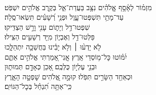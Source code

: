 \documentclass[twoside, openany, parskip=half, 11pt]{book}
\begin{document}
\\
\vspace{-1.5\baselineskip}
\begin{narrow}
%
מִזְמ֗וֹר לְאָ֫סָ֥ף \hfill \break
אֱֽלֹהִ֗ים נִצָּ֥ב בַּעֲדַת־אֵ֑ל \hfill בְּקֶ֖רֶב אֱלֹהִ֣ים יִשְׁפֹּֽט׃ \\
 עַד־מָתַ֥י תִּשְׁפְּטוּ־עָ֑וֶל \hfill וּפְנֵ֥י רְ֝שָׁעִ֗ים תִּשְׂאוּ־סֶֽלָה׃ \\
 שִׁפְטוּ־דַ֥ל וְיָת֑וֹם \hfill עָנִ֖י וָרָ֣שׁ הַצְדִּֽיקוּ׃ \\
 פַּלְּטוּ־דַ֥ל וְאֶבְי֑וֹן \hfill מִיַּ֖ד רְשָׁעִ֣ים הַצִּֽילוּ׃ \\
 לֹ֤א יָדְע֨וּ ׀ וְלֹ֥א יָבִ֗ינוּ \hfill בַּחֲשֵׁכָ֥ה יִתְהַלָּ֑כוּ \\ יִ֝מּ֗וֹטוּ כׇּל־מ֥וֹסְדֵי אָֽרֶץ׃ \hfill
 אֲֽנִי־אָ֭מַרְתִּי אֱלֹהִ֣ים אַתֶּ֑ם \\ וּבְנֵ֖י עֶלְי֣וֹן כֻּלְּכֶֽם׃ \hfill
 אָ֭כֵן כְּאָדָ֣ם תְּמוּת֑וּן \\ וּכְאַחַ֖ד הַשָּׂרִ֣ים תִּפֹּֽלוּ׃ \hfill
 קוּמָ֣ה אֱ֭לֹהִים שׇׁפְטָ֣ה הָאָ֑רֶץ \\ כִּֽי־אַתָּ֥ה תִ֝נְחַ֗ל בְּכׇל־הַגּוֹיִֽם׃ \hfill \break
\end{narrow}
\end{document}
